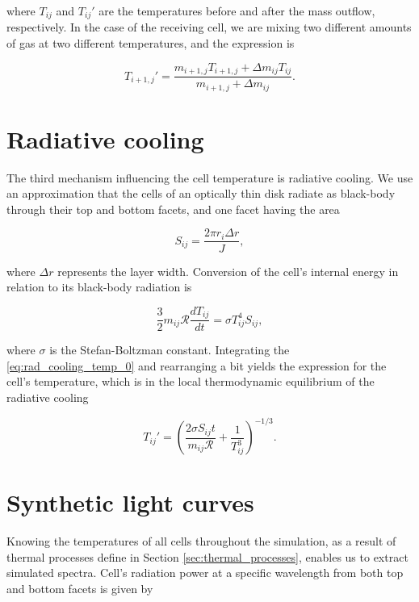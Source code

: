 where $T_{ij}$ and $T_{ij}'$ are the temperatures before and after the mass outflow, respectively. In the case of the receiving cell, we are mixing two different amounts of gas at two different temperatures, and the expression is

\begin{equation}
T_{i+1,j}' = \frac{m_{i+1,j} T_{i+1,j} + \Delta m_{ij} T_{ij}}{m_{i+1,j} + \Delta m_{ij}}.
\end{equation}

\section{Radiative cooling}

The third mechanism influencing the cell temperature is radiative cooling. We use an approximation that the cells of an optically thin disk radiate as black-body through their top and bottom facets, and one facet having the area

\begin{equation}
	S_{ij} = \frac{2 \pi r_i \Delta r}{J},
	\label{eq:facet_area}
\end{equation}

where $\Delta r$ represents the layer width. Conversion of the cell's internal energy in relation to its black-body radiation is

\begin{equation}
	\frac{3}{2} m_{ij} \mathcal{R} \frac{dT_{ij}}{dt} = \sigma T_{ij}^4 S_{ij},
	\label{eq:rad_cooling_temp_0}
\end{equation}

where $\sigma$ is the Stefan-Boltzman constant. Integrating the \eqref{eq:rad_cooling_temp_0} and rearranging a bit yields the expression for the cell's temperature, which is in the local thermodynamic equilibrium of the radiative cooling

\begin{equation}
T_{ij}' = \left( \frac{2 \sigma S_{ij} t}{m_{ij} \mathcal{R}} + \frac{1}{T_{ij}^3} \right)^{-1/3}.
\end{equation}


\section{Synthetic light curves}

Knowing the temperatures of all cells throughout the simulation, as a result of thermal processes define in Section \ref{sec:thermal_processes}, enables us to extract simulated spectra. Cell's radiation power at a specific wavelength from both top and bottom facets is given by

